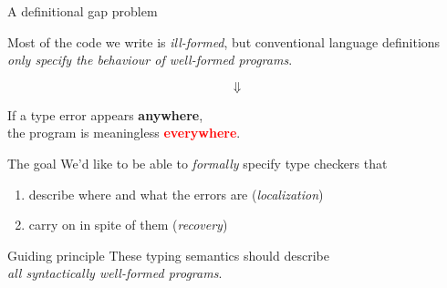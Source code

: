 

\begin{frame}{A definitional gap problem}
  \begin{center}
    Most of the code we write is \emph{ill-formed}\pause,
    but conventional language definitions
    \emph{only specify the behaviour of well-formed programs}.
  \end{center}
  \pause
  \[%
    \bm{\Downarrow}
  \]%

  \begin{center}
    If a type error appears \textcolor{RedOrange}{\textbf{anywhere}},\\
    the program is meaningless \textcolor{Red}{\textbf{everywhere}}.
  \end{center}
\end{frame}

\begin{frame}{The goal}
  We'd like to be able to \emph{formally} specify type checkers that \\[0.5em]

  \pause
  \begin{enumerate}
    \item describe where and what the errors are \pause (\emph{localization})
    
      \pause
    \item carry on in spite of them \pause (\emph{recovery})
  \end{enumerate}

  \vspace{1em}
  \pause
  \begin{mainbox}[]{Guiding principle}
    \pause
    These typing semantics should describe \\
    \emph{all syntactically well-formed programs}.
  \end{mainbox}
\end{frame}

